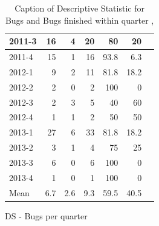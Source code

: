 \documentclass[UKenglish]{ifimaster}  %
\begin{document}
\begin{appendices}
\begin{table}[!htbp]
\begin{adjustwidth}{-1.5cm}{}
\begin{subfigure}[b]{0.3\textwidth}
{\begin{tabular}{ | l | r | r | r | r | r | r | }
2011-3 & 16 & 4 & 20 & 80 & 20 \\ \hline
2011-4 & 15 & 1 & 16 & 93.8 & 6.3 \\ \hline
2012-1 & 9 & 2 & 11 & 81.8 & 18.2 \\ \hline
2012-2 & 2 & 0 & 2 & 100 & 0 \\ \hline
2012-3 & 2 & 3 & 5 & 40 & 60 \\ \hline
2012-4 & 1 & 1 & 2 & 50 & 50 \\ \hline
2013-1 & 27 & 6 & 33 & 81.8 & 18.2 \\ \hline
2013-2 & 3 & 1 & 4 & 75 & 25 \\ \hline
2013-3 & 6 & 0 & 6 & 100 & 0 \\ \hline
2013-4 & 1 & 0 & 1 & 100 & 0 \\ \hline
Mean &6.7&2.6&9.3&59.5&40.5 \\ \hline

\end{tabular}
}
\caption{DS - Bugs per quarter}
 \label{DS:FTPQ:8}
\end{subfigure}
\end{adjustwidth}
\caption[Optional caption for list of figures]{Caption of Descriptive Statistic for Bugs and Bugs finished within quarter  , }
\label{DS:8:5} %
\end{table}


\end{appendices}
\end{document}
